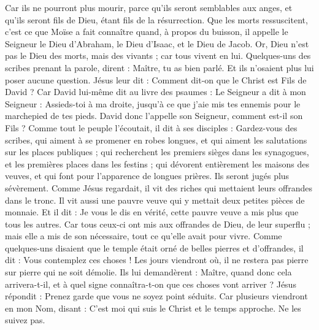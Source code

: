 \begin{multicols}{2}
Car ils ne pourront plus mourir, parce qu'ils seront semblables aux anges, et qu'ils seront fils de Dieu, étant fils de la résurrection.
Que les morts ressuscitent, c'est ce que Moïse a fait connaître quand, à propos du buisson, il appelle le Seigneur le Dieu d'Abraham, le Dieu d'Isaac, et le Dieu de Jacob.
Or, Dieu n'est pas le Dieu des morts, mais des vivants ; car tous vivent en lui.
Quelques-uns des scribes prenant la parole, dirent : Maître, tu as bien parlé.
Et ils n'osaient plus lui poser aucune question.
Jésus leur dit : Comment dit-on que le Christ est Fils de David ?
Car David lui-même dit au livre des psaumes : Le Seigneur a dit à mon Seigneur : Assieds-toi à ma droite,
jusqu'à ce que j'aie mis tes ennemis pour le marchepied de tes pieds.
David donc l'appelle son Seigneur, comment est-il son Fils ?
Comme tout le peuple l'écoutait, il dit à ses disciples :
Gardez-vous des scribes, qui aiment à se promener en robes longues, et qui aiment les salutations sur les places publiques ; qui recherchent les premiers sièges dans les synagogues, et les premières places dans les festins ;
qui dévorent entièrement les maisons des veuves, et qui font pour l'apparence de longues prières. Ils seront jugés plus sévèrement.
\VerseOne{}Comme Jésus regardait, il vit des riches qui mettaient leurs offrandes dans le tronc.
Il vit aussi une pauvre veuve qui y mettait deux petites pièces de monnaie.
Et il dit : Je vous le dis en vérité, cette pauvre veuve a mis plus que tous les autres.
Car tous ceux-ci ont mis aux offrandes de Dieu, de leur superflu ; mais elle a mis de son nécessaire, tout ce qu'elle avait pour vivre.
Comme quelques-uns disaient que le temple était orné de belles pierres et d'offrandes, il dit :
Vous contemplez ces choses ! Les jours viendront où, il ne restera pas pierre sur pierre qui ne soit démolie.
Ils lui demandèrent : Maître, quand donc cela arrivera-t-il, et à quel signe connaîtra-t-on que ces choses vont arriver ?
Jésus répondit : Prenez garde que vous ne soyez point séduits. Car plusieurs viendront en mon Nom, disant : C'est moi qui suis le Christ et le temps approche. Ne les suivez pas.

\end{multicols}
